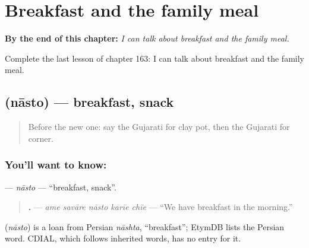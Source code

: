 
\chapter{Breakfast and the family meal}
\label{ch:gu-breakfast-and-the-family-meal}

\begin{chapteropening}
\textbf{By the end of this chapter:} \emph{I can talk about breakfast and the family meal.}

Complete the last lesson of chapter 163: I can talk about breakfast and the family meal.
\end{chapteropening}

\section[\texorpdfstring{\gu{નાસ્તો} (nāsto)}{નાસ્તો (nāsto)}]{ (nāsto) — breakfast, snack}

\label{lesson:GU-C163-nasto}



\begin{quote}
Before the new one: say the Gujarati for clay pot, then the Gujarati for corner.
\end{quote}

\subsection*{You'll want to know: }
\textbf{} — \emph{nāsto} — \textquotedblleft{}breakfast, snack\textquotedblright{}.

\begin{quote}
\textbf{    .} — \emph{ame savāre nāsto karīe chīe} — \textquotedblleft{}We have breakfast in the morning.\textquotedblright{}
\end{quote}

\begin{cousinweb}
\textbf{} (\emph{nāsto}) is a loan from Persian \emph{nāshta}, \textquotedblleft{}breakfast\textquotedblright{}; EtymDB lists the Persian word. CDIAL, which follows inherited words, has no entry for it.
\end{cousinweb}

